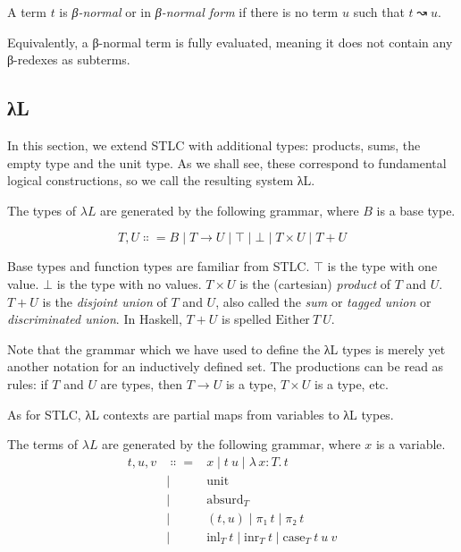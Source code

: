 \documentclass{article}
\theoremstyle{definition}
\newcommand{\Lam}[2]{λ\,#1.\, #2}
\newcommand{\unit}{\mathrm{unit}}
\newcommand{\absurd}{\mathrm{absurd}}
\newcommand{\inl}{\ensuremath{\mathrm{inl}}}
\newcommand{\inr}{\ensuremath{\mathrm{inr}}}
\newcommand{\case}{\mathrm{case}}
\begin{document}
\begin{definition}
  A term $t$ is \emph{β-normal} or in \emph{β-normal form} if there is no term $u$ such that $t ↝ u$.
\end{definition}

Equivalently, a β-normal term is fully evaluated, meaning it does not contain any β-redexes as subterms.

\subsection{λL}

In this section, we extend STLC with additional types: products, sums, the empty type and the unit type.
As we shall see, these correspond to fundamental logical constructions, so we call the resulting system λL.

\begin{definition}[Types]
  The types of $λL$ are generated by the following grammar, where $B$ is a base type.

  \[
    T,U ∷= B \mid T → U \mid ⊤ \mid ⊥ \mid T × U \mid T + U
  \]
\end{definition}

Base types and function types are familiar from STLC.
$⊤$ is the type with one value.
$⊥$ is the type with no values.
$T × U$ is the (cartesian) \emph{product} of $T$ and $U$.
$T + U$ is the \emph{disjoint union} of $T$ and $U$, also called the \emph{sum} or \emph{tagged union} or \emph{discriminated union}.
In Haskell, $T + U$ is spelled $\mathrm{Either}~T~U$.

Note that the grammar which we have used to define the λL types is merely yet another notation for an inductively defined set.
The productions can be read as rules: if $T$ and $U$ are types, then $T → U$ is a type, $T × U$ is a type, etc.

\begin{definition}[Contexts]
  As for STLC, λL contexts are partial maps from variables to λL types.
\end{definition}

\begin{definition}[Terms]
  The terms of $λL$ are generated by the following grammar, where $x$ is a variable.
  \begin{eqnarray*}
    t,u,v &∷=& x \mid t~u \mid \Lam{x : T}{t} \\
          &\mid& \unit \\
          &\mid& \absurd_{T} \\
          &\mid& (t,u) \mid π₁~t \mid π₂~t \\
          &\mid& \inl_{T}~t \mid \inr_{T}~t \mid \case_{T}~t~u~v
  \end{eqnarray*}
\end{definition}
\end{document}
